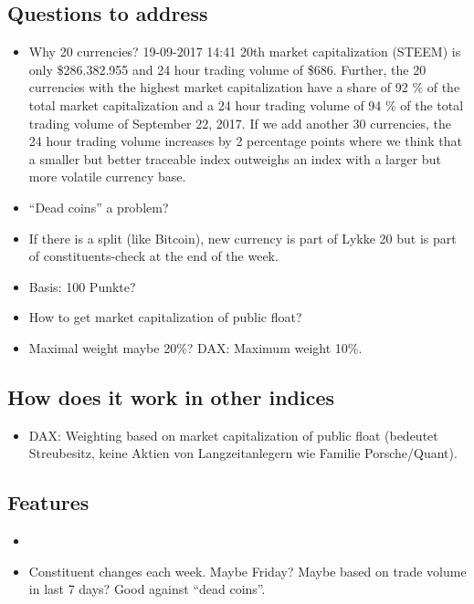 \documentclass[11pt]{article}
\begin{document}
\subsection{Questions to address}
\begin{itemize}
  \item Why 20 currencies? 19-09-2017 14:41 20th market capitalization (STEEM) is only \$286.382.955 and 24 hour trading volume of \$686. Further, the 20 currencies with the highest market capitalization have a share of 92 \% of the total market capitalization and a 24 hour trading volume of 94 \% of the total trading volume of September 22, 2017. If we add another 30 currencies, the 24 hour trading volume increases by 2 percentage points where we think that a smaller but better traceable index outweighs an index with a larger but more volatile currency base.
  \item ``Dead coins'' a problem?
  \item If there is a split (like Bitcoin), new currency is part of Lykke 20 but is part of constituents-check at the end of the week.
  \item Basis: 100 Punkte?
  \item How to get market capitalization of public float?
  \item Maximal weight maybe 20\%? DAX: Maximum weight 10\%.
\end{itemize}

\subsection{How does it work in other indices}

\begin{itemize}
  \item DAX: Weighting based on market capitalization of public float (bedeutet Streubesitz, keine Aktien von Langzeitanlegern  wie Familie Porsche/Quant).
\end{itemize}

\subsection{Features}

\begin{itemize}
  \item
  \item Constituent changes each week. Maybe Friday? Maybe based on trade volume in last 7 days? Good against ``dead coins''.
\end{itemize}
\end{document}
